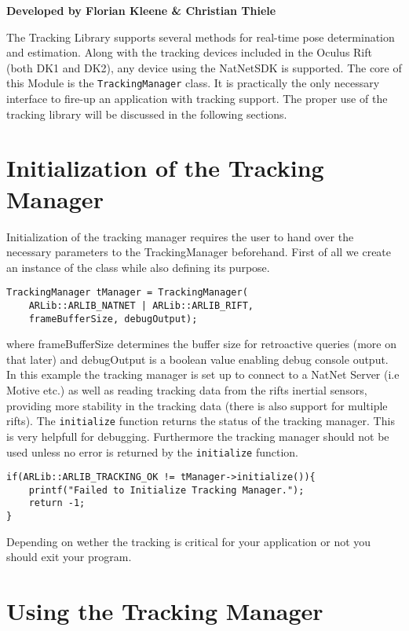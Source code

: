 \begin{center}
\textbf{Developed by Florian Kleene \& Christian Thiele}
\end{center}
The Tracking Library supports several methods for real-time pose determination and estimation. Along with the tracking devices included in the Oculus Rift (both DK1 and DK2\cite{dk2}), any device using the NatNetSDK\cite{optitrack} is supported. The core of this Module is the \texttt{TrackingManager} class. It is practically the only necessary interface to fire-up an application with tracking support. The proper use of the tracking library will be discussed in the following sections.
\section{Initialization of the Tracking Manager}\label{tracking-manager-initialization}

Initialization of the tracking manager requires the user to hand over the necessary parameters to the TrackingManager beforehand. First of all we create an instance of the class while also defining its purpose.

\begin{lstlisting}
TrackingManager tManager = TrackingManager(
    ARLib::ARLIB_NATNET | ARLib::ARLIB_RIFT,
    frameBufferSize, debugOutput);
\end{lstlisting}
where frameBufferSize determines the buffer size for retroactive queries (more on that later) and debugOutput is a boolean value enabling debug console output. In this example the tracking manager is set up to connect to a NatNet Server (i.e Motive etc.) as well as reading tracking data from the rifts inertial sensors, providing more stability in the tracking data (there is also support for multiple rifts).
The \texttt{initialize} function returns the status of the tracking manager. This is very helpfull for debugging. Furthermore the tracking manager should not be used unless no error is returned by the \texttt{initialize} function.

\begin{lstlisting}
if(ARLib::ARLIB_TRACKING_OK != tManager->initialize()){
    printf("Failed to Initialize Tracking Manager.");
    return -1;
}
\end{lstlisting}
Depending on wether the tracking is critical for your application or not you should exit your program.

\section{Using the Tracking Manager}\label{using-the-tracking-manager}

